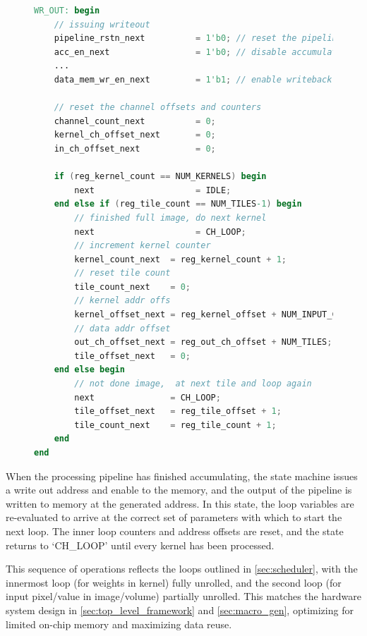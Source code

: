\documentclass{uw-ece-wkrpt}
\begin{document}
\begin{figure}
\centering
\begin{lstlisting}[caption={Sequencer state machine part 2}, label=lst:sequencer_fsm_2, language=Verilog]
WR_OUT: begin
    // issuing writeout
    pipeline_rstn_next          = 1'b0; // reset the pipeline
    acc_en_next                 = 1'b0; // disable accumulation
    ...
    data_mem_wr_en_next         = 1'b1; // enable writeback memory

    // reset the channel offsets and counters
    channel_count_next          = 0;
    kernel_ch_offset_next       = 0;
    in_ch_offset_next           = 0;

    if (reg_kernel_count == NUM_KERNELS) begin
        next                    = IDLE;
    end else if (reg_tile_count == NUM_TILES-1) begin
        // finished full image, do next kernel
        next                    = CH_LOOP;
        // increment kernel counter
        kernel_count_next  = reg_kernel_count + 1;
        // reset tile count
        tile_count_next    = 0;
        // kernel addr offs
        kernel_offset_next = reg_kernel_offset + NUM_INPUT_CHANNELS;
        // data addr offset
        out_ch_offset_next = reg_out_ch_offset + NUM_TILES;
        tile_offset_next   = 0;
    end else begin
        // not done image,  at next tile and loop again
        next               = CH_LOOP;
        tile_offset_next   = reg_tile_offset + 1;
        tile_count_next    = reg_tile_count + 1;
    end
end
\end{lstlisting}
\end{figure}

When the processing pipeline has finished accumulating, the state machine issues a write out address and enable to the memory, and the output of the pipeline is written to memory at the generated address. In this state, the loop variables are re-evaluated to arrive at the correct set of parameters with which to start the next loop. The inner loop counters and address offsets are reset, and the state returns to `CH\_LOOP' until every \gls{kernel} has been processed.

This sequence of operations reflects the loops outlined in \ref{sec:scheduler}, with the innermost loop (for weights in \gls{kernel}) fully unrolled, and the second loop (for input pixel/value in image/volume) partially unrolled. This matches the hardware system design in \ref{sec:top_level_framework} and \ref{sec:macro_gen}, optimizing for limited on-chip memory and maximizing data reuse.
\end{document}
